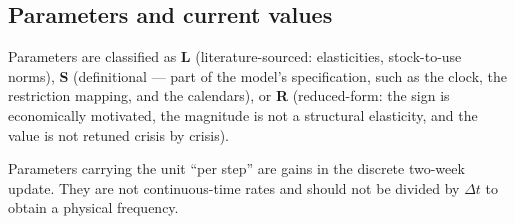 \subsection{Parameters and current values}

Parameters are classified as \textbf{L} (literature-sourced: elasticities,
stock-to-use norms), \textbf{S} (definitional --- part of the model's
specification, such as the clock, the restriction mapping, and the
calendars), or \textbf{R} (reduced-form: the sign is economically
motivated, the magnitude is not a structural elasticity, and the value is
not retuned crisis by crisis).

Parameters carrying the unit ``per step'' are gains in the discrete
two-week update. They are not continuous-time rates and should not be
divided by \(\Delta t\) to obtain a physical frequency.

